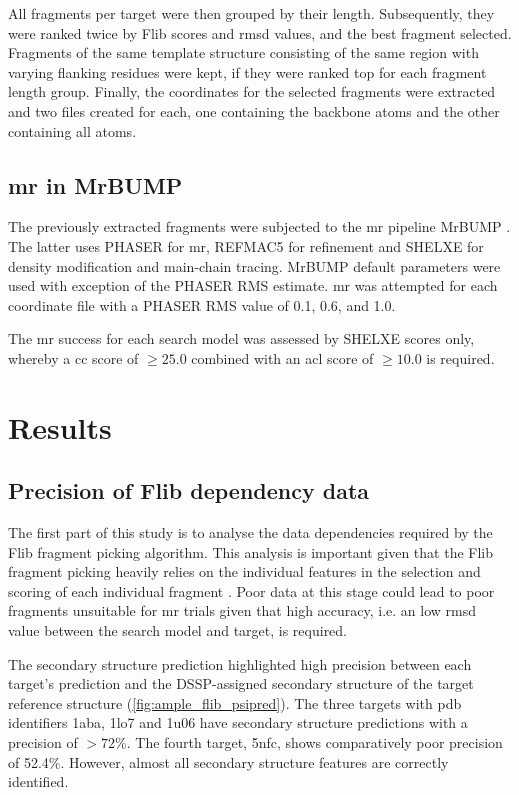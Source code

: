 All fragments per target were then grouped by their length. Subsequently, they were ranked twice by Flib scores and \gls{rmsd} values, and the best fragment selected. Fragments of the same template structure consisting of the same region with varying flanking residues were kept, if they were ranked top for each fragment length group. Finally, the coordinates for the selected fragments were extracted and two files created for each, one containing the backbone atoms and the other containing all atoms.

\subsection{\acrlong{mr} in MrBUMP}
The previously extracted fragments were subjected to the \gls{mr} pipeline MrBUMP \cite{Keegan2008-hk}. The latter uses PHASER \cite{McCoy2007-bf} for \gls{mr}, REFMAC5 \cite{Murshudov2011-we} for refinement and SHELXE \cite{Thorn2013-ir} for density modification and main-chain tracing. MrBUMP default parameters were used with exception of the PHASER RMS estimate. \gls{mr} was attempted for each coordinate file with a PHASER RMS value of 0.1, 0.6, and 1.0.

The \gls{mr} success for each search model was assessed by SHELXE scores only, whereby a \gls{cc} score of $\geq25.0$ combined with an \gls{acl} score of $\geq10.0$ is required.


\section{Results}
\subsection{Precision of Flib dependency data}
The first part of this study is to analyse the data dependencies required by the Flib fragment picking algorithm. This analysis is important given that the Flib fragment picking heavily relies on the individual features in the selection and scoring of each individual fragment \cite{De_Oliveira2015-ba}. Poor data at this stage could lead to poor fragments unsuitable for \gls{mr} trials given that high accuracy, i.e. an low \gls{rmsd} value between the search model and target, is required.

The secondary structure prediction highlighted high precision between each target's prediction and the DSSP-assigned \cite{Frishman1995-ns} secondary structure of the target reference structure (\cref{fig:ample_flib_psipred}). The three targets with \gls{pdb} identifiers 1aba, 1lo7 and 1u06 have secondary structure predictions with a precision of $>72$\%. The fourth target, 5nfc, shows comparatively poor precision of 52.4\%. However, almost all secondary structure features are correctly identified.

